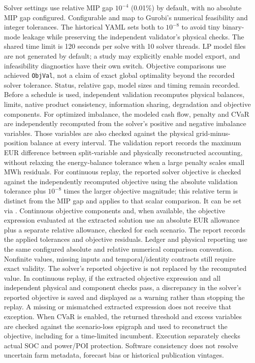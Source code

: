 \documentclass[11pt,a4paper]{article}
\begin{document}
Solver settings use relative MIP gap $10^{-4}$ (0.01\%) by default, with no absolute
MIP gap configured. Configurable  and
 map to Gurobi's numerical feasibility and integer
tolerances. The historical YAML sets both to $10^{-8}$ to avoid tiny binary-mode
leakage while preserving the independent validator's physical checks.
The shared time limit is 120 seconds per solve with 10 solver threads. LP model
files are not generated by default; a study may explicitly enable model export,
and infeasibility diagnostics have their own switch. Objective comparisons use
achieved \texttt{ObjVal}, not a claim of exact global optimality beyond the
recorded solver tolerance. Status,
relative gap, model sizes and timing remain recorded. Before a schedule is used,
independent validation recomputes physical balances, limits, native product
consistency, information sharing, degradation and objective components. For
optimized imbalance, the modeled cash flow, penalty and CVaR are independently
recomputed from the solver's positive and negative imbalance variables. Those
variables are also checked against the physical grid-minus-position balance at
every interval. The validation report records the maximum EUR difference between
split-variable and physically reconstructed accounting, without relaxing the
energy-balance tolerance when a large penalty scales small MWh residuals.
For continuous replay, the reported solver objective is checked against the
independently recomputed objective using the absolute validation tolerance plus
$10^{-8}$ times the larger objective magnitude; this relative term is distinct
from the MIP gap and applies to that scalar comparison. It can be set via
. Continuous objective
components and, when available, the objective expression evaluated at the
extracted solution use an absolute EUR allowance plus a separate relative
allowance, checked for each scenario. The report records the applied tolerances
and objective residuals. Ledger and physical reporting use the same configured
absolute and relative numerical comparison convention. Nonfinite values, missing
inputs and temporal/identity contracts still require exact validity. The solver's reported objective is not
replaced by the recomputed value. In continuous replay, if the extracted
objective expression and all independent physical and component checks pass,
a discrepancy in the solver's reported objective is saved and displayed as a
warning rather than stopping the replay. A missing or mismatched extracted
expression does not receive that exception. When CVaR is enabled, the returned threshold
and excess variables are checked against the scenario-loss epigraph and used
to reconstruct the objective, including for a time-limited incumbent.
Execution
separately checks actual SOC and power/POI protection. Software consistency does
not resolve uncertain farm metadata, forecast bias or historical publication
vintages.
\end{document}
